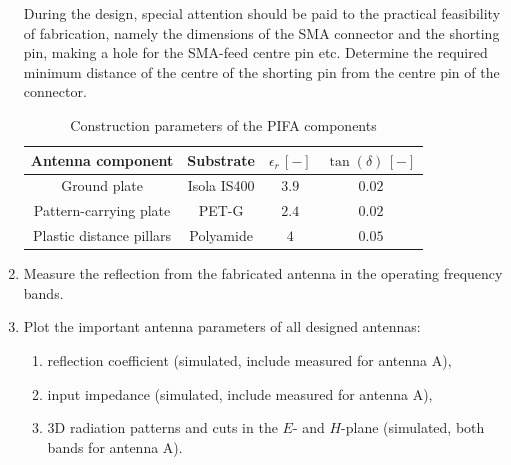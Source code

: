 \documentclass[11pt,a4paper]{article}
\begin{document}
\begin{enumerate}[label=\arabic*.]
        During the design, special attention should be paid to the practical feasibility of fabrication, namely the dimensions of the SMA connector and the shorting pin, making a hole for the SMA-feed centre pin etc. Determine the required minimum distance of the centre of the shorting pin from the centre pin of the connector.
        \begin{table}[!ht]
            \centering
            \begin{tabular}{|c|c|c|c|}
                \hline
                Antenna component & Substrate & $\epsilon_r\,[-]$ & $\tan(\delta)\,[-]$\\
                \hline\hline
                Ground plate & Isola IS400 & $3.9$ & $0.02$\\
                \hline
                Pattern-carrying plate & PET-G & $2.4$ & $0.02$\\
                \hline
                Plastic distance pillars & Polyamide & $4$ & $0.05$\\
                \hline
            \end{tabular}
            \caption{\label{table:pifa-construction-parameters}Construction parameters of the PIFA components}
        \end{table}

        \item Measure the reflection from the fabricated antenna in the operating frequency bands.
        
        \item Plot the important antenna parameters of all designed antennas:
        \begin{enumerate}[label=4.\arabic*]
            \item reflection coefficient (simulated, include measured for antenna A),
            \item input impedance (simulated, include measured for antenna A),
            \item 3D radiation patterns and cuts in the $E$- and $H$-plane (simulated, both bands for antenna A).
        \end{enumerate}


\end{enumerate}
\end{document}
